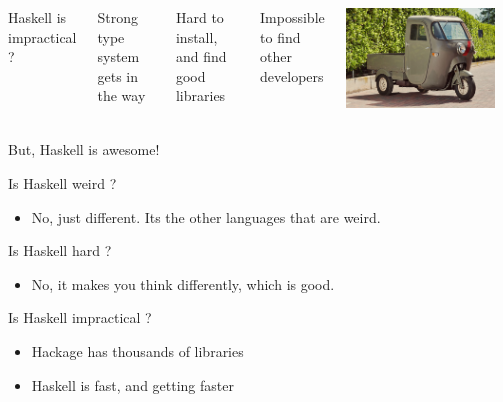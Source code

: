 \documentclass[xcolor={table}]{beamer}
\begin{document}
\begin{frame}{}{}

    \begin{columns}
    {\Large Haskell is impractical ? }

    \pause\bigskip
    Strong type system gets in the way

    \pause\bigskip
    Hard to install, and find good libraries

    \pause\bigskip
    Impossible to find other developers

    \pause

    \includegraphics[width=0.9\textwidth]{images/ducati-muletto.jpg}
        
    \end{columns}

\end{frame}

\begin{frame}{}{}

    {\Large But, Haskell is awesome! }

    \pause
    Is Haskell weird ?\pause
    \begin{itemize}
        \item No, just different. Its the other languages that are weird.
    \end{itemize}

    \pause
    Is Haskell hard ?\pause 
    \begin{itemize}
        \item No, it makes you think differently, which is good.
    \end{itemize}

    \pause
    Is Haskell impractical ?\pause 
    \begin{itemize}
        \item Hackage has thousands of libraries
        \item Haskell is fast, and getting faster
    \end{itemize}

\end{frame}
\end{document}
